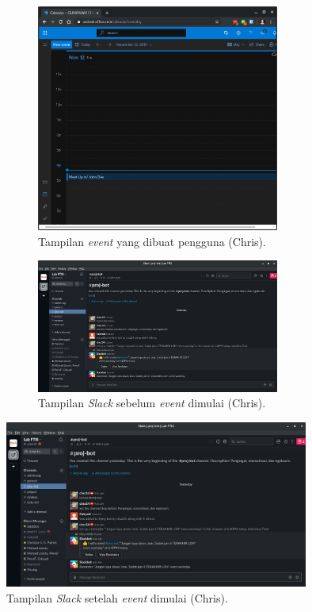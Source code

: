 \begin{figure}[h]
\begin{subfigure}{8.5cm}
  \centering
  \includegraphics[width=8cm]{./Gambar/PengujianChris/Outlook.png}
  \caption{Tampilan \textit{event} yang dibuat pengguna (Chris).}
  \label{fig:outlook_chris}
\end{subfigure}
\begin{subfigure}{8.5cm}
  \centering
  \includegraphics[width=8cm]{./Gambar/PengujianChris/Slack_Before.png}
  \caption{Tampilan \textit{Slack} sebelum \textit{event} dimulai (Chris).}
  \label{fig:slack_before_chris}
\end{subfigure}
\caption{}
\end{figure}

\begin{figure}[h]
  \includegraphics[width=10cm]{./Gambar/PengujianChris/Slack_After.png}
  \centering
  \caption{Tampilan \textit{Slack} setelah \textit{event} dimulai (Chris).}
  \label{fig:slack_after_chris}
\end{figure}


